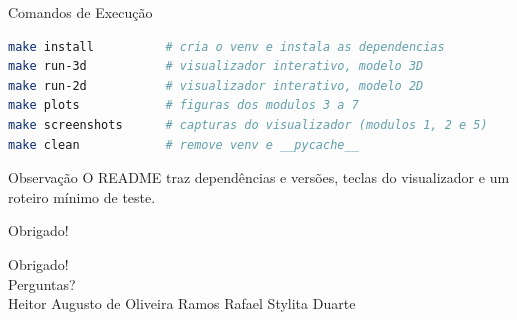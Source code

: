 \documentclass[aspectratio=169,11pt]{beamer}
\begin{document}
\begin{frame}[fragile]{Comandos de Execução}
\begin{lstlisting}[language=bash]
make install          # cria o venv e instala as dependencias
make run-3d           # visualizador interativo, modelo 3D
make run-2d           # visualizador interativo, modelo 2D
make plots            # figuras dos modulos 3 a 7
make screenshots      # capturas do visualizador (modulos 1, 2 e 5)
make clean            # remove venv e __pycache__
\end{lstlisting}

\begin{block}{Observação}
O README traz dependências e versões, teclas do visualizador e um roteiro mínimo de teste.
\end{block}
\end{frame}

\begin{frame}{Obrigado!}
\begin{center}
{\Huge Obrigado!}\\[0.5cm]
{\large Perguntas?}\\[0.5cm]
Heitor Augusto de Oliveira Ramos \quad\textbullet\quad Rafael Stylita Duarte
\end{center}
\end{frame}
\end{document}
